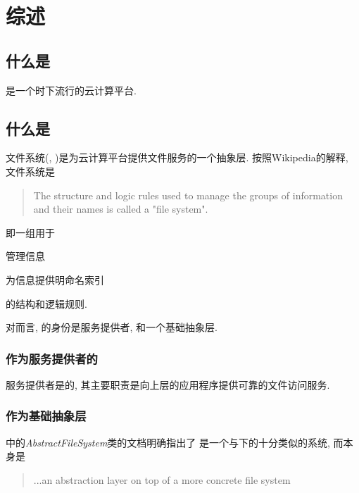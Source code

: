 \chapter{\HadoopFS 综述}
\label{ch:hfs-intro}


\section{什么是\Hadoop}
\label{ch:hfs-intro:hadoop}

\Hadoop 是一个时下流行的云计算平台. 

\section{什么是\HadoopFS}
\label{ch:hfs-intro:hfs}

\Hadoop 文件系统(\HadoopFS, \HFS)是为\Hadoop 云计算平台提供文件服务的一个抽象层.
按照Wikipedia的解释, 文件系统是
\begin{quote}
The structure and logic rules used to manage the groups of information and their names is called a "file system".
\end{quote}
即一组用于
\begin{XeEnum}
    \item 管理信息
    \item 为信息提供明命名索引
\end{XeEnum}
的结构和逻辑规则.

对\Hadoop 而言, \HFS 的身份是服务提供者, 和一个基础抽象层.

\subsection{作为服务提供者的\HFS}

服务提供者是的\HFS, 其主要职责是向上层的\Hadoop 应用程序提供可靠的文件访问服务.

\subsection{作为基础抽象层\HFS}


\HadoopFS{}中的\emph{AbstractFileSystem}类的文档明确指出了\HFS
是一个与\UNIX 下的\VFS 十分类似的系统,
而\VFS 本身是
\begin{quote}
    ...an abstraction layer on top of a more concrete file system
\end{quote}

